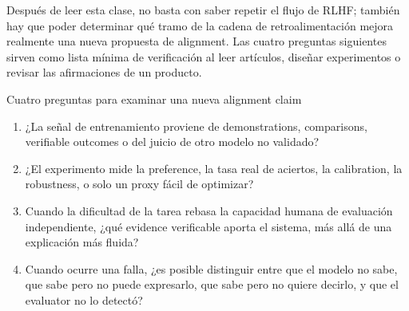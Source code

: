 \documentclass[a4paper]{article}
\begin{document}
Después de leer esta clase, no basta con saber repetir el flujo de RLHF; también hay que poder determinar qué tramo de la cadena de retroalimentación mejora realmente una nueva propuesta de alignment. Las cuatro preguntas siguientes sirven como lista mínima de verificación al leer artículos, diseñar experimentos o revisar las afirmaciones de un producto.

\begin{knowledgebox}{Cuatro preguntas para examinar una nueva alignment claim}
\begin{enumerate}
  \item ¿La señal de entrenamiento proviene de demonstrations, comparisons, verifiable outcomes o del juicio de otro modelo no validado?
  \item ¿El experimento mide la preference, la tasa real de aciertos, la calibration, la robustness, o solo un proxy fácil de optimizar?
  \item Cuando la dificultad de la tarea rebasa la capacidad humana de evaluación independiente, ¿qué evidence verificable aporta el sistema, más allá de una explicación más fluida?
  \item Cuando ocurre una falla, ¿es posible distinguir entre que el modelo no sabe, que sabe pero no puede expresarlo, que sabe pero no quiere decirlo, y que el evaluator no lo detectó?
\end{enumerate}
\end{knowledgebox}
\end{document}
